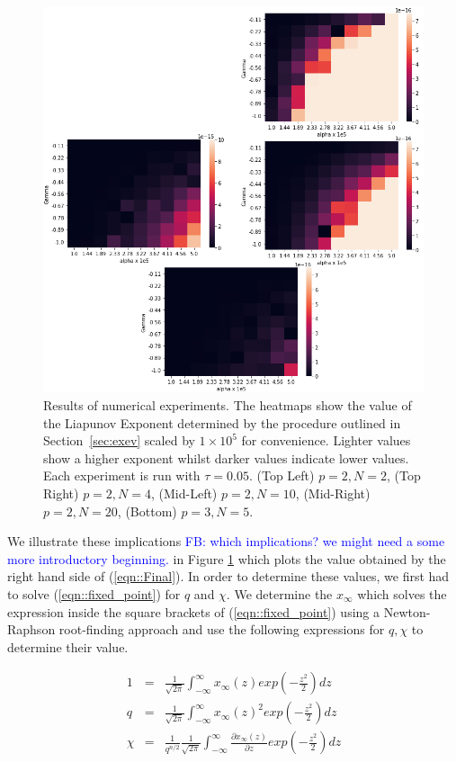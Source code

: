 \documentclass[sigconf,anonymous]{aamas}
\newcommand{\xfixed}{x_\infty}
\newcommand\fb[1]{\textcolor{blue}{FB: #1}}
\begin{document}
\begin{figure}
    \centering
    \includegraphics[width = 1.1 \linewidth]{Figures/Theory.png}
    \caption{Results of numerical experiments. The heatmaps show the value of the Liapunov Exponent determined by the procedure outlined in Section~\ref{sec:exev} scaled by $1 \times 10^5$ for convenience. Lighter values show a higher exponent whilst darker values indicate lower values. Each experiment is run with $\tau = 0.05$. (Top Left) $p = 2, N = 2$, (Top Right) $p = 2, N = 4$, (Mid-Left) $p = 2, N = 10$, (Mid-Right) $p = 2, N = 20$, (Bottom) $p = 3, N = 5$.}
    \label{fig:theory}
\end{figure}

We illustrate these implications \fb{which implications? we might need a some more introductory beginning.} in Figure \ref{fig:theory}
which plots the value obtained by the right hand side of
(\ref{eqn::Final}). In order to determine these values, we first had
to solve (\ref{eqn::fixed_point}) for $q$ and $\chi$. We determine the
$\xfixed$ which solves the expression inside the square brackets of
(\ref{eqn::fixed_point}) using a Newton-Raphson root-finding approach
and use the following expressions for $q, \chi$ to determine their
value.

\begin{eqnarray*}
        1 & = & \frac{1}{\sqrt{2 \pi}} \int_{-\infty}^{\infty} \xfixed(z) exp(-\frac{z^2}{2}) dz \\ 
        q & = & \frac{1}{\sqrt{2 \pi}} \int_{-\infty}^{\infty} \xfixed(z)^2 exp(-\frac{z^2}{2}) dz \\ 
        \chi & = & \frac{1}{q^{n/2}}\frac{1}{\sqrt{2 \pi}} \int_{-\infty}^{\infty} \frac{\partial \xfixed (z)}{\partial z} exp(-\frac{z^2}{2}) dz
\end{eqnarray*}
\end{document}
